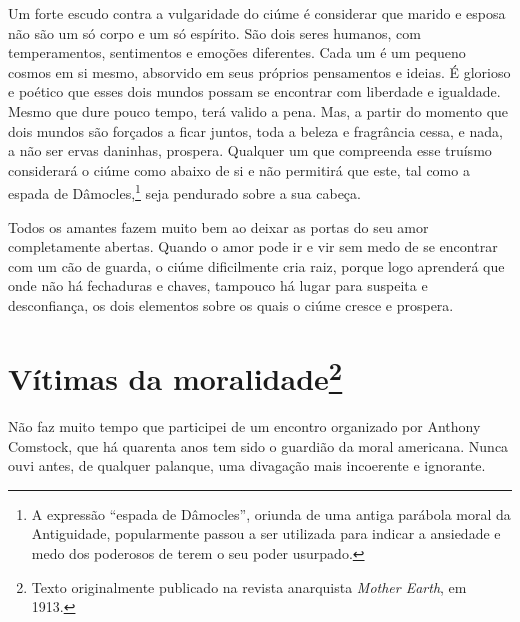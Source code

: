Um forte escudo contra a vulgaridade do ciúme é considerar que marido e
esposa não são um só corpo e um só espírito. São dois seres humanos, com
temperamentos, sentimentos e emoções diferentes. Cada um é um pequeno
cosmos em si mesmo, absorvido em seus próprios pensamentos e ideias. É
glorioso e poético que esses dois mundos possam se encontrar com
liberdade e igualdade. Mesmo que dure pouco tempo, terá valido a pena.
Mas, a partir do momento que dois mundos são forçados a ficar juntos,
toda a beleza e fragrância cessa, e nada, a não ser ervas daninhas,
prospera. Qualquer um que compreenda esse truísmo considerará o ciúme
como abaixo de si e não permitirá que este, tal como a espada de
Dâmocles,\footnote{A expressão ``espada de Dâmocles'', oriunda de uma antiga parábola moral da Antiguidade, popularmente passou a ser utilizada para indicar a ansiedade e medo dos poderosos de terem o seu poder usurpado.} seja pendurado sobre a sua cabeça.

Todos os amantes fazem muito bem ao deixar as portas do seu amor
completamente abertas. Quando o amor pode ir e vir sem medo de se
encontrar com um cão de guarda, o ciúme dificilmente cria raiz, porque
logo aprenderá que onde não há fechaduras e chaves, tampouco há lugar
para suspeita e desconfiança, os dois elementos sobre os quais o ciúme
cresce e prospera.

\chapter{Vítimas da moralidade\footnote{Texto originalmente publicado na revista
  anarquista \emph{Mother Earth}, em 1913.}}

Não faz muito tempo que participei de um encontro organizado por Anthony
Comstock, que há quarenta anos tem sido o guardião da moral americana.
Nunca ouvi antes, de qualquer palanque, uma divagação mais incoerente e
ignorante.

